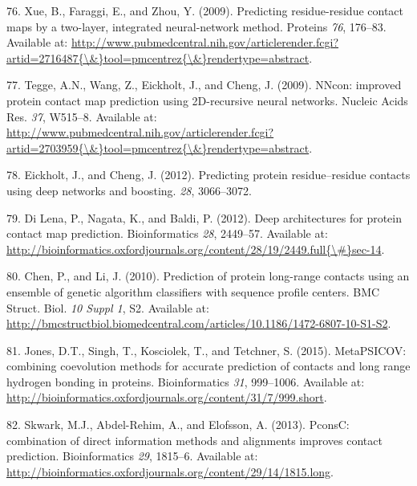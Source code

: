\documentclass[11pt,a4paper,twoside]{book}
\theoremstyle{definition}
\theoremstyle{definition}
\theoremstyle{remark}
\begin{document}
\hypertarget{ref-Xue2009a}{}
76. Xue, B., Faraggi, E., and Zhou, Y. (2009). Predicting
residue-residue contact maps by a two-layer, integrated neural-network
method. Proteins \emph{76}, 176--83. Available at:
\href{http://www.pubmedcentral.nih.gov/articlerender.fcgi?artid=2716487\%7B/\&\%7Dtool=pmcentrez\%7B/\&\%7Drendertype=abstract}{http://www.pubmedcentral.nih.gov/articlerender.fcgi?artid=2716487\{\textbackslash{}\&\}tool=pmcentrez\{\textbackslash{}\&\}rendertype=abstract}.

\hypertarget{ref-Tegge2009a}{}
77. Tegge, A.N., Wang, Z., Eickholt, J., and Cheng, J. (2009). NNcon:
improved protein contact map prediction using 2D-recursive neural
networks. Nucleic Acids Res. \emph{37}, W515--8. Available at:
\href{http://www.pubmedcentral.nih.gov/articlerender.fcgi?artid=2703959\%7B/\&\%7Dtool=pmcentrez\%7B/\&\%7Drendertype=abstract}{http://www.pubmedcentral.nih.gov/articlerender.fcgi?artid=2703959\{\textbackslash{}\&\}tool=pmcentrez\{\textbackslash{}\&\}rendertype=abstract}.

\hypertarget{ref-Eickholt2012}{}
78. Eickholt, J., and Cheng, J. (2012). Predicting protein
residue--residue contacts using deep networks and boosting. \emph{28},
3066--3072.

\hypertarget{ref-DiLena2012a}{}
79. Di Lena, P., Nagata, K., and Baldi, P. (2012). Deep architectures
for protein contact map prediction. Bioinformatics \emph{28}, 2449--57.
Available at:
\href{http://bioinformatics.oxfordjournals.org/content/28/19/2449.full\%7B/\#\%7Dsec-14}{http://bioinformatics.oxfordjournals.org/content/28/19/2449.full\{\textbackslash{}\#\}sec-14}.

\hypertarget{ref-Chen2010}{}
80. Chen, P., and Li, J. (2010). Prediction of protein long-range
contacts using an ensemble of genetic algorithm classifiers with
sequence profile centers. BMC Struct. Biol. \emph{10 Suppl 1}, S2.
Available at:
\url{http://bmcstructbiol.biomedcentral.com/articles/10.1186/1472-6807-10-S1-S2}.

\hypertarget{ref-Jones2015}{}
81. Jones, D.T., Singh, T., Kosciolek, T., and Tetchner, S. (2015).
MetaPSICOV: combining coevolution methods for accurate prediction of
contacts and long range hydrogen bonding in proteins. Bioinformatics
\emph{31}, 999--1006. Available at:
\url{http://bioinformatics.oxfordjournals.org/content/31/7/999.short}.

\hypertarget{ref-Skwark2013}{}
82. Skwark, M.J., Abdel-Rehim, A., and Elofsson, A. (2013). PconsC:
combination of direct information methods and alignments improves
contact prediction. Bioinformatics \emph{29}, 1815--6. Available at:
\url{http://bioinformatics.oxfordjournals.org/content/29/14/1815.long}.
\end{document}
